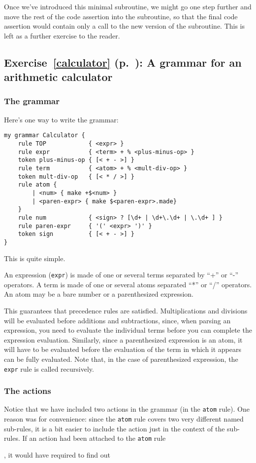 {Once we've introduced this minimal subroutine, we 
might go one step further and move the rest of the 
code assertion into the subroutine, so that the final code 
assertion would contain only a call to the new version 
of the subroutine. This is left as a further exercise 
to the reader.

\subsection{Exercise~\ref{calculator} (p.~\pageref{calculator}): 
A grammar for an arithmetic calculator}
\label{sol_calculator}

\subsubsection{The grammar}

Here's one way to write the grammar:

\begin{verbatim}
my grammar Calculator {
    rule TOP            { <expr> }
    rule expr           { <term> + % <plus-minus-op> }
    token plus-minus-op { [< + - >] }
    rule term           { <atom> + % <mult-div-op> }
    token mult-div-op   { [< * / >] }
    rule atom {
        | <num> { make +$<num> }
        | <paren-expr> { make $<paren-expr>.made}
    }
    rule num            { <sign> ? [\d+ | \d+\.\d+ | \.\d+ ] }
    rule paren-expr     { '(' <expr> ')' }
    token sign          { [< + - >] }
}
\end{verbatim}

This is quite simple.

An expression (\verb'expr') is made of one or several terms 
separated by ``+'' or ``-'' operators. A term is made of one 
or several atoms separated ``*'' or ``/'' operators. An atom 
may be a bare number or a parenthesized expression.

This guarantees that precedence rules are satisfied. 
Multiplications and divisions will be 
evaluated before additions and subtractions, since, when 
parsing an expression, you need to evaluate the individual 
terms before you can complete the expression evaluation. 
Similarly, since a parenthesized expression is an atom, it 
will have to be evaluated before the evaluation of the term 
in which it appears can be fully evaluated. Note that, in 
the case of parenthesized expression, the \verb'expr' rule 
is called recursively.

\subsubsection{The actions}

Notice that we have included two actions in the grammar (in 
the {\tt atom} rule). One reason was for convenience: since 
the {\tt atom} rule covers two very different named 
sub-rules, it is a bit easier to include the action just 
in the context of the sub-rules. If an action had been attached 
to the  {\tt atom} rule}, it would have required to find out 

